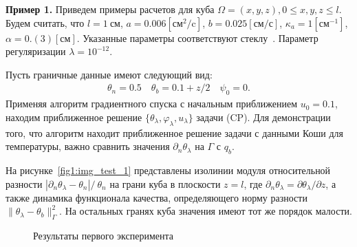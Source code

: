 \textbf{Пример 1.}
Приведем примеры расчетов для куба
$\Omega = {(x, y, z), 0 \leq x,y,z \leq l}$.
Будем считать, что $l=1~\text{см}$, $a = 0.006[\text{см}^2/\text{c}]$,
$b=0.025[\text{см}/\text{с}]$,
$\kappa_a=1[\text{см}^{-1}]$, $\alpha = 0.(3)[\text{см}]$.
Указанные параметры соответствуют стеклу~\cite{Grenkin5}.
Параметр регуляризации $\lambda=10^{-12}.$

Пусть граничные данные имеют следующий вид:
\begin{gather*}
    \theta_n = 0.5 \quad
    \theta_b = 0.1 + z/2 \quad
    \psi_0 = 0.
\end{gather*}
Применяя алгоритм градиентного спуска
с начальным приближением $u_0 = 0.1$, находим приближенное решение
$\{\theta_\lambda,\varphi_\lambda,u_\lambda\}$ задачи (CP)\@.
Для демонстрации того, что алгоритм находит приближенное решение задачи с данными
Коши для температуры, важно сравнить значения $\partial_n\theta_\lambda$ на $\Gamma$ с $q_b.$

На рисунке~\ref{fig1:img_test_1} представлены изолинии модуля относительной разности
$|\partial_n\theta_\lambda-\theta_n|/\ \theta_n$
на грани куба в плоскости $z=l$, где
$\partial_n\theta_\lambda=\partial\theta_\lambda/\partial z$,
а также динамика функционала качества, определяющего
норму разности $\|\theta_\lambda -\theta_b\|^2_\Gamma$.
На остальных гранях куба значения имеют тот же порядок малости.

\begin{figure}[H]
    \centering
    \caption{Результаты первого эксперимента}
    \label{fig1}
\end{figure}
